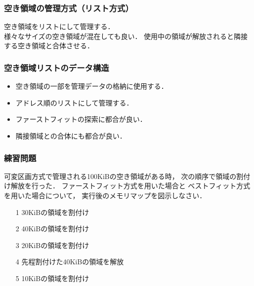 \documentclass{beamer}                   %
\begin{document}
\begin{frame}
  \frametitle{空き領域の管理方式（リスト方式）}
  空き領域をリストにして管理する．\\
  様々なサイズの空き領域が混在しても良い．
  使用中の領域が解放されると隣接する空き領域と合体させる．
\end{frame}

\begin{frame}
  \frametitle{空き領域リストのデータ構造}
  \begin{itemize}
    \item 空き領域の一部を管理データの格納に使用する．
    \item アドレス順のリストにして管理する．
    \item ファーストフィットの探索に都合が良い．
    \item 隣接領域との合体にも都合が良い．
  \end{itemize}
\end{frame}

\begin{frame}
  \frametitle{練習問題}
  可変区画方式で管理される100KiBの空き領域がある時，
  次の順序で領域の割付け解放を行った．
  ファーストフィット方式を用いた場合と
  ベストフィット方式を用いた場合について，
  実行後のメモリマップを図示しなさい．

  \begin{enumerate}
  \item[1] 30KiBの領域を割付け
  \item[2] 40KiBの領域を割付け
  \item[3] 20KiBの領域を割付け
  \item[4] 先程割付けた40KiBの領域を解放
  \item[5] 10KiBの領域を割付け
  \end{enumerate}
\end{frame}
\end{document}
